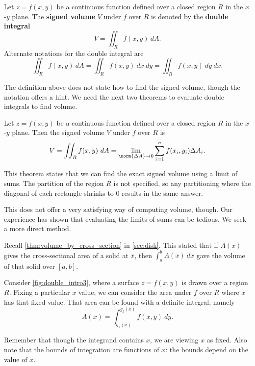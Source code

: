 {Let $z=f(x,y)$ be a continuous function defined over a closed region $R$ in the $x$-$y$ plane. The \textbf{signed volume} $V$ under $f$ over $R$ is denoted by the \textbf{double integral}
\[V = \iint_R f(x,y)\ dA.\]
Alternate notations for the double integral are
\[\iint_R f(x,y)\ dA=\iint_R f(x,y)\ dx\ dy=\iint_R f(x,y)\ dy\ dx.\]}

The definition above does not state how to find the signed volume, though the notation offers a hint. We need the next two theorems to evaluate double integrals to find volume.

{Let $z=f(x,y)$ be a continuous function defined over a closed region $R$ in the $x$-$y$ plane. Then the signed volume $V$ under $f$ over $R$ is
\[V = \iint_R f(x,y)\ dA = \lim_{\norm{\Delta A}\to 0}\sum_{i=1}^n f(x_i,y_i)\Delta A_i.\]}

This theorem states that we can find the exact signed volume using a limit of sums. The partition of the region $R$ is not specified, so any partitioning where the diagonal of each rectangle shrinks to 0 results in the same answer. 

This does not offer a very satisfying way of computing volume, though. Our experience has shown that evaluating the limits of sums can be tedious. We seek a more direct method.

Recall \autoref{thm:volume_by_cross_section} in \autoref{sec:disk}. This stated that if $A(x)$ gives the cross-sectional area of a solid at $x$, then $\int_a^b A(x)\ dx$ gave the volume of that solid over $[a,b]$. 

Consider \autoref{fig:double_intro3}, where a surface $z=f(x,y)$ is drawn over a region $R$. Fixing a particular $x$ value, we can consider the area under $f$ over $R$ where $x$ has that fixed value. That area can be found with a definite integral, namely
\[ A(x)=\int_{g_1(x)}^{g_2(x)} f(x,y)\ dy.\]

Remember that though the integrand contains $x$, we are viewing $x$ as fixed. Also note that the bounds of integration are functions of $x$: the bounds depend on the value of $x$. 


